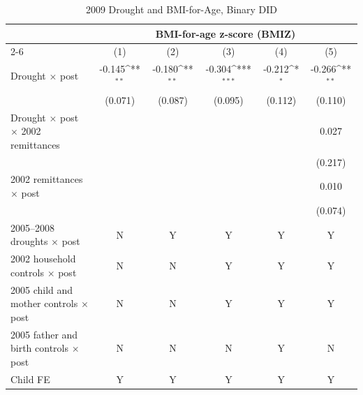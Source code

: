 \documentclass[12pt]{article}
\def\sym#1{\ifmmode^{#1}\else\(^{#1}\)\fi}
\begin{document}
\endgroup
\clearpage
\begingroup
\footnotesize
\renewcommand{\arraystretch}{0.86}
\setlength{\tabcolsep}{4pt}
\setlength{\LTcapwidth}{\textwidth}
\begin{longtable}{l*{5}{c}}
\caption{2009 Drought and BMI-for-Age, Binary DID}\\
\toprule
 & \multicolumn{5}{c}{BMI-for-age z-score (BMIZ)}\\
\cmidrule(lr){2-6}
            &\multicolumn{1}{c}{(1)}         &\multicolumn{1}{c}{(2)}         &\multicolumn{1}{c}{(3)}         &\multicolumn{1}{c}{(4)}         &\multicolumn{1}{c}{(5)}         \\
\midrule
Drought \ensuremath{\times} post&      -0.145\sym{**} &      -0.180\sym{**} &      -0.304\sym{***}&      -0.212\sym{*}  &      -0.266\sym{**} \\
            &     (0.071)         &     (0.087)         &     (0.095)         &     (0.112)         &     (0.110)         \\
Drought \ensuremath{\times} post \ensuremath{\times} 2002 remittances&                     &                     &                     &                     &       0.027         \\
            &                     &                     &                     &                     &     (0.217)         \\
2002 remittances \ensuremath{\times} post&                     &                     &                     &                     &       0.010         \\
            &                     &                     &                     &                     &     (0.074)         \\
\midrule
2005--2008 droughts \ensuremath{\times} post&           N         &           Y         &           Y         &           Y         &           Y         \\
2002 household controls \ensuremath{\times} post&           N         &           N         &           Y         &           Y         &           Y         \\
2005 child and mother controls \ensuremath{\times} post&           N         &           N         &           Y         &           Y         &           Y         \\
2005 father and birth controls \ensuremath{\times} post&           N         &           N         &           N         &           Y         &           N         \\
Child FE    &           Y         &           Y         &           Y         &           Y         &           Y         \\

\end{longtable}
\end{document}
